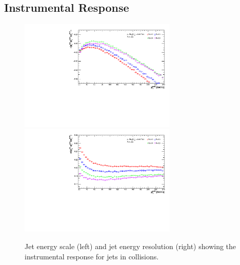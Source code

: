 \subsection{Instrumental Response}
\label{sec:InstResponse}

\begin{figure}[h!]
    \centering
    \begin{multicols}{2}
            \includegraphics[width=7.5cm]{figures/EnergyScale/EnergyScaleMean.pdf}
        \vfill\null 
        \columnbreak
            \includegraphics[width=7.5cm]{figures/EnergyScale/EnergyScaleWidth.pdf}
        \vfill\null
    \end{multicols}
    \caption{Jet energy scale (left) and jet energy resolution (right) showing the instrumental response for jets in \pp collisions.}
    \label{fig:EnergyScale}
\end{figure}


